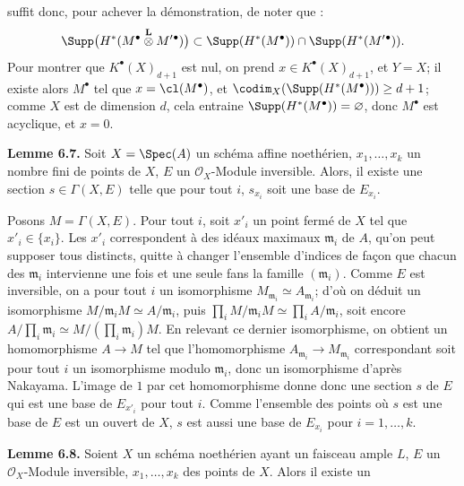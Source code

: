 suffit donc, pour achever la démonstration, de noter que :
\[
\Supp\bigl(H^*(M^\bullet\overset{\mathbf L}{\otimes}M'{}^\bullet)\bigr)
 \subset \Supp(H^*(M^\bullet))\cap\Supp(H^*(M'{}^\bullet)).
\]
Pour montrer que $K^{\bullet}(X)_{d+1}$ est nul, on prend $x\in K^{\bullet}(X)_{d+1}$, et $Y=X$; il existe alors $M^\bullet$ tel que $x=\cl(M^\bullet)$, et $\codim_X(\Supp(H^*(M^\bullet)))\ge d+1$; comme $X$ est de dimension $d$, cela entraine $\Supp(H^*(M^\bullet))=\varnothing$, donc $M^\bullet$ est acyclique, et $x=0$.

\textbf{Lemme 6.7.} Soit $X=\Spec(A)$ un schéma affine noethérien, $x_1,\ldots,x_k$ un nombre fini de points de $X$, $E$ un $\mathcal O_X$-Module inversible. Alors, il existe une section $s\in\Gamma(X,E)$ telle que pour tout $i$, $s_{x_i}$ soit une base de $E_{x_i}$.

Posons $M=\Gamma(X,E)$. Pour tout $i$, soit $x'_i$ un point fermé de $X$ tel que $x'_i\in\{x_i\}$. Les $x'_i$ correspondent à des idéaux maximaux $\mathfrak m_i$ de $A$, qu'on peut supposer tous distincts, quitte à changer l'ensemble d'indices de façon que chacun des $\mathfrak m_i$ intervienne une fois et une seule fans la famille $(\mathfrak m_i)$. Comme $E$ est inversible, on a pour tout $i$ un isomorphisme $M_{\mathfrak m_i}\simeq A_{\mathfrak m_i}$; d'où on déduit un isomorphisme $M/\mathfrak m_iM\simeq A/\mathfrak m_i$, puis $\prod_i M/\mathfrak m_iM\simeq\prod_i A/\mathfrak m_i$, soit encore $A/\prod_i\mathfrak m_i\simeq M/(\prod_i\mathfrak m_i)M$. En relevant ce dernier isomorphisme, on obtient un homomorphisme $A\to M$ tel que l'homomorphisme $A_{\mathfrak m_i}\to M_{\mathfrak m_i}$ correspondant soit pour tout $i$ un isomorphisme modulo $\mathfrak m_i$, donc un isomorphisme d'après Nakayama. L'image de $1$ par cet homomorphisme donne donc une section $s$ de $E$ qui est une base de $E_{x'_i}$ pour tout $i$. Comme l'ensemble des points où $s$ est une base de $E$ est un ouvert de $X$, $s$ est aussi une base de $E_{x_i}$ pour $i=1,\ldots,k$.

\textbf{Lemme 6.8.} Soient $X$ un schéma noethérien ayant un faisceau ample $L$, $E$ un $\mathcal O_X$-Module inversible, $x_1,\ldots,x_k$ des points de $X$. Alors il existe un
